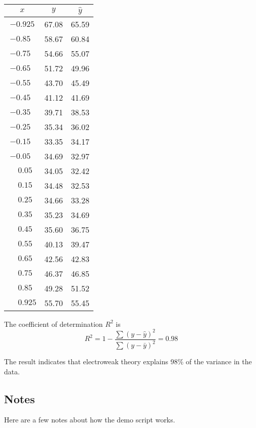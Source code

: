 \documentclass[12pt]{article}
\begin{document}
\begin{center}
\begin{tabular}{|c|c|c|}
\hline
$x$ & $y$ & $\hat{y}$ \\
\hline
$-0.925$ & 67.08 & 65.59\\
$-0.85\phantom{0}$ & 58.67 & 60.84\\
$-0.75\phantom{0}$ & 54.66 & 55.07\\
$-0.65\phantom{0}$ & 51.72 & 49.96\\
$-0.55\phantom{0}$ & 43.70 & 45.49\\
$-0.45\phantom{0}$ & 41.12 & 41.69\\
$-0.35\phantom{0}$ & 39.71 & 38.53\\
$-0.25\phantom{0}$ & 35.34 & 36.02\\
$-0.15\phantom{0}$ & 33.35 & 34.17\\
$-0.05\phantom{0}$ & 34.69 & 32.97\\
$\phantom{+}0.05\phantom{0}$ & 34.05 & 32.42\\
$\phantom{+}0.15\phantom{0}$ & 34.48 & 32.53\\
$\phantom{+}0.25\phantom{0}$ & 34.66 & 33.28\\
$\phantom{+}0.35\phantom{0}$ & 35.23 & 34.69\\
$\phantom{+}0.45\phantom{0}$ & 35.60 & 36.75\\
$\phantom{+}0.55\phantom{0}$ & 40.13 & 39.47\\
$\phantom{+}0.65\phantom{0}$ & 42.56 & 42.83\\
$\phantom{+}0.75\phantom{0}$ & 46.37 & 46.85\\
$\phantom{+}0.85\phantom{0}$ & 49.28 & 51.52\\
$\phantom{+}0.925$ & 55.70 & 55.45\\
\hline
\end{tabular}
\end{center}

The coefficient of determination $R^2$ is
\begin{equation*}
R^2=1-\frac{\sum(y-\hat{y})^2}{\sum(y-\bar{y})^2}=0.98
\end{equation*}

The result indicates that electroweak theory explains 98\% of the variance in the data.

\subsection*{Notes}
Here are a few notes about how the demo script works.
\end{document}
